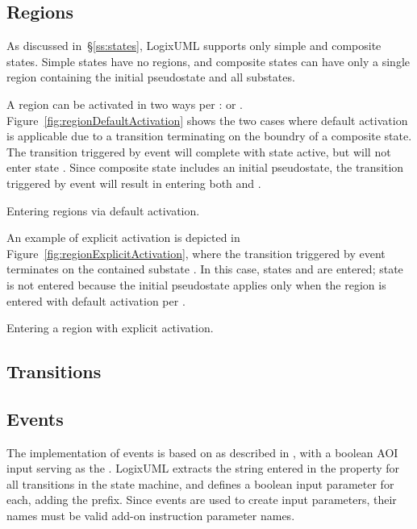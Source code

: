 \subsection{Regions}

As discussed in~\S\ref{ss:states}, LogixUML supports only simple and
composite states. Simple states have no regions, and composite states
can have only a single region containing the initial pseudostate and
all substates.

A region can be activated in two ways per \textcite[\S14.2.3.2]{OMGUML}:
 or
.
Figure~\ref{fig:regionDefaultActivation} shows the two cases where
default activation is applicable due to a transition terminating
on the boundry of a composite state. The transition triggered by
event  will complete with state 
active, but will not enter state .
Since composite state  includes an initial
pseudostate, the transition triggered by event  will
result in entering both  and .

               {Entering regions via default activation.}

An example of explicit activation is depicted in
Figure~\ref{fig:regionExplicitActivation}, where the transition triggered
by event  terminates on the contained substate
. In this case, states  and
 are entered;
state  is not entered because the initial pseudostate
applies only when the region is entered with default activation per
\textcite[\S14.2.3.7]{OMGUML}.

               {Entering a region with explicit activation.}


\subsection{Transitions}


\subsection{Events}

The implementation of events is based on 
as described in \textcite[\S13.3.3.3]{OMGUML}, with a boolean AOI input
serving as the . LogixUML extracts
the string entered in the  property for
all transitions
in the state machine, and defines a boolean input parameter for each,
adding the  prefix. Since events are used to create
input parameters, their names must be valid add-on instruction parameter
names.

